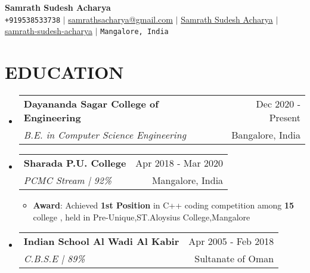 \documentclass[letterpaper,11pt]{article}
\makeatletter
\newcommand{\resumeItem}[1]{
  \item\small{
    {#1 \vspace{-1pt}}
  }
}
\newcommand{\resumeSubheading}[4]{
  \vspace{-1pt}\item
    \begin{tabular*}{\textwidth}[t]{l@{\extracolsep{\fill}}r}
      \textbf{#1} & {\color{dark-grey}\small #2}\vspace{1pt}\\ %
      \textit{#3} & {\color{dark-grey} \small #4}\\ %
    \end{tabular*}\vspace{-4pt}
}
\newcommand{\resumeSubHeadingListStart}{\begin{itemize}[leftmargin=0in, label={}]}
\newcommand{\resumeSubHeadingListEnd}{\end{itemize}}
\newcommand{\resumeItemListStart}{\begin{itemize}}
\newcommand{\resumeItemListEnd}{\end{itemize}\vspace{0pt}}
\makeatother
\begin{document}
\begin{center}
    \textbf{\Huge Samrath Sudesh Acharya} \\ \vspace{5pt}
    \small \faPhone* \texttt{+919538533738} \hspace{1pt} $|$
    \hspace{1pt} \faEnvelope \hspace{2pt} \href{mailto:samrathsacharya@gmail.com}{samrathsacharya@gmail.com} \hspace{1pt} $|$ 
    \hspace{1pt} \faLinkedinSquare \hspace{2pt} \href{https://www.linkedin.com/in/samrath-sudesh-acharya/}{Samrath Sudesh Acharya} \hspace{1pt} $|$
    \hspace{1pt} \faGithub \hspace{2pt} \href{https://github.com/samrath-sudesh-acharya}{samrath-sudesh-acharya}
    \hspace{1pt} $|$
    \hspace{1pt} \faMapMarker* \hspace{2pt}\texttt{Mangalore, India} 
    \\ \vspace{-3pt}
\end{center}

\section {EDUCATION}
  \resumeSubHeadingListStart
    \resumeSubheading
      {Dayananda Sagar College of Engineering}{Dec 2020 - Present}
      {B.E. in Computer Science Engineering}{Bangalore, India}
        
    \resumeSubheading
      {Sharada P.U. College}{Apr 2018 - Mar 2020}
      {PCMC Stream | 92\%}{Mangalore, India}
      	\resumeItemListStart
    	\resumeItem {\textbf{Award}: Achieved \textbf{1st Position} in C++ coding competition among \textbf{15} college , held in \newline Pre-Unique,ST.Aloysius College,Mangalore}
        \resumeItemListEnd
    
    \resumeSubheading
      {Indian School Al Wadi Al Kabir}{Apr 2005 - Feb 2018}
      {C.B.S.E | 89\%}{Sultanate of Oman}
  \resumeSubHeadingListEnd

\end{document}
